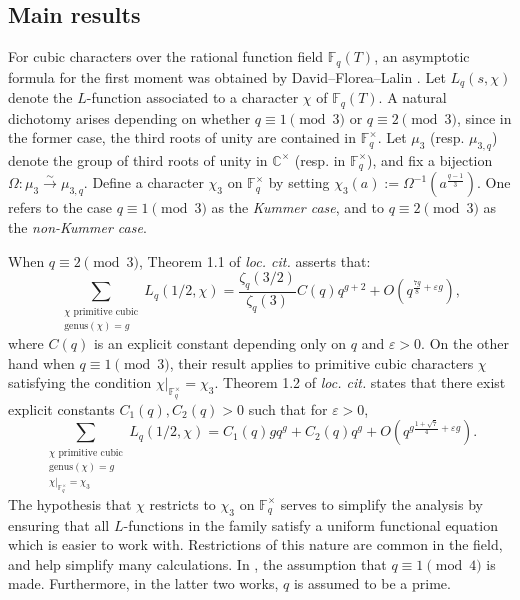 \documentclass[table]{amsart}
\newcommand{\F}{\mathbb{F}}
\numberwithin{equation}{section}
\begin{document}
\subsection{Main results}
\par For cubic characters over the rational function field $\F_q(T)$, an asymptotic formula for the first moment was obtained by David–Florea–Lalin \cite{DFLCubic}. Let $L_q(s, \chi)$ denote the $L$-function associated to a character $\chi$ of $\F_q(T)$. A natural dichotomy arises depending on whether $q \equiv 1 \pmod{3}$ or $q \equiv 2 \pmod{3}$, since in the former case, the third roots of unity are contained in $\F_q^\times$. Let $\mu_3$ (resp. $\mu_{3,q}$) denote the group of third roots of unity in $\mathbb{C}^\times$ (resp. in $\F_q^\times$), and fix a bijection $\Omega: \mu_3 \xrightarrow{\sim} \mu_{3,q}$. Define a character $\chi_3$ on $\F_q^\times$ by setting $\chi_3(a) := \Omega^{-1}(a^{\frac{q-1}{3}})$. One refers to the case $q \equiv 1 \pmod{3}$ as the \emph{Kummer case}, and to $q \equiv 2 \pmod{3}$ as the \emph{non-Kummer case}.

\par When $q \equiv 2 \pmod{3}$, Theorem 1.1 of \emph{loc. cit.} asserts that:
\[
\sum_{\substack{\chi \text{ primitive cubic} \\ \mathrm{genus}(\chi) = g}} L_q(1/2, \chi)
= \frac{\zeta_q(3/2)}{\zeta_q(3)} C(q) q^{g+2} + O(q^{\frac{7g}{8} + \varepsilon g}),
\]
where $C(q)$ is an explicit constant depending only on $q$ and $\varepsilon>0$. On the other hand when $q \equiv 1 \pmod{3}$, their result applies to primitive cubic characters $\chi$ satisfying the condition $\chi|_{\F_q^\times} = \chi_3$. Theorem 1.2 of \emph{loc. cit.} states that there exist explicit constants $C_1(q), C_2(q) > 0$ such that for $\varepsilon>0$,
\[
\sum_{\substack{\chi \text{ primitive cubic} \\ \mathrm{genus}(\chi) = g \\ \chi|_{\F_q^\times} = \chi_3}} L_q(1/2, \chi)
= C_1(q) g q^{g} + C_2(q) q^{g} + O\left(q^{g\frac{1 + \sqrt{7}}{4} + \varepsilon g}\right).
\]
The hypothesis that $\chi$ restricts to $\chi_3$ on $\F_q^\times$ serves to simplify the analysis by ensuring that all $L$-functions in the family satisfy a uniform functional equation which is easier to work with. Restrictions of this nature are common in the field, and help simplify many calculations. In \cite{andradekeating, Florea2ndand3rd, Florea4th}, the assumption that $q\equiv 1\pmod{4}$ is made. Furthermore, in the latter two works, $q$ is assumed to be a prime.
\end{document}
